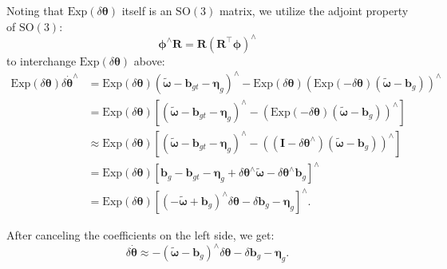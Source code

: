 Noting that $\mathrm{Exp}(\delta \boldsymbol{\theta})$ itself is an $\mathrm{SO}(3)$ matrix, we utilize the adjoint property of $\mathrm{SO}(3)$:
\begin{equation}\label{key}
	\boldsymbol{\phi}^\wedge \mathbf{R} = \mathbf{R} (\mathbf{R}^\top \boldsymbol{\phi})^\wedge
\end{equation}
to interchange $\mathrm{Exp}(\delta \boldsymbol{\theta})$ above:
\begin{equation}\label{key}
	\begin{aligned}
		\mathrm{Exp} (\delta \boldsymbol{\theta}) \delta \dot{\boldsymbol{\theta}}^\wedge &= 
		\mathrm{Exp} (\delta \boldsymbol{\theta}) \left( \tilde{\boldsymbol{\omega}} - \mathbf{b}_{gt} - 
		\boldsymbol{\eta}_g \right)^\wedge - \mathrm{Exp} (\delta \boldsymbol{\theta})  \left( 
		\mathrm{Exp} (-\delta \boldsymbol{\theta})  (\tilde{\boldsymbol{\omega}}-\mathbf{b}_g) 
		\right)^\wedge \\
		&=  \mathrm{Exp} (\delta \boldsymbol{\theta}) \left[ (\tilde{\boldsymbol{\omega}} - \mathbf{b}_{gt} - 
		\boldsymbol{\eta}_g)^\wedge - (\mathrm{Exp} (-\delta \boldsymbol{\theta})  
		(\tilde{\boldsymbol{\omega}}-\mathbf{b}_g) )^\wedge \right] \\
		&\approx \mathrm{Exp} (\delta \boldsymbol{\theta}) \left[ (\tilde{\boldsymbol{\omega}} - 
		\mathbf{b}_{gt} - \boldsymbol{\eta}_g)^\wedge - \left((\mathbf{I} - \delta 
		\boldsymbol{\theta}^\wedge)(\tilde{\boldsymbol{\omega}}-\mathbf{b}_g )\right)^\wedge \right] \\
		&=  \mathrm{Exp} (\delta \boldsymbol{\theta}) \left[ \mathbf{b}_g - \mathbf{b}_{gt} -\boldsymbol{\eta}_g 
		+ \delta \boldsymbol{\theta}^\wedge \tilde{\boldsymbol{\omega}} - \delta 
		\boldsymbol{\theta}^\wedge \mathbf{b}_{g} \right]^\wedge \\
		&= \mathrm{Exp} (\delta \boldsymbol{\theta}) \left[ 
		(-\tilde{\boldsymbol{\omega}}+\mathbf{b}_g)^\wedge \delta \boldsymbol{\theta} - \delta \mathbf{b}_g - 
		\boldsymbol{\eta}_g \right]^\wedge.
	\end{aligned}
\end{equation}

After canceling the coefficients on the left side, we get:
\begin{equation}\label{key}
	\delta \dot{\boldsymbol{\theta}} \approx -(\tilde{\boldsymbol{\omega}} - \mathbf{b}_g)^\wedge \delta 
	\boldsymbol{\theta} - \delta \mathbf{b}_g - \boldsymbol{\eta}_g. 
\end{equation}

